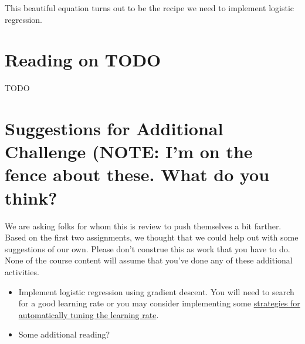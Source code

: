 \documentclass[assignment03_Solutions]{subfiles}
\begin{document}
This beautiful equation turns out to be the recipe we need to implement logistic regression.




\section{Reading on TODO}
TODO

\section{Suggestions for Additional Challenge (NOTE: I'm on the fence about these.  What do you think?}

We are asking folks for whom this is review to push themselves a bit farther.  Based on the first two assignments, we thought that we could help out with some suggestions of our own.  Please don't construe this as work that you have to do.  None of the course content will assume that you've done any of these additional activities.

\begin{itemize}
\item Implement logistic regression using gradient descent.  You will need to search for a good learning rate or you may consider implementing some \href{https://towardsdatascience.com/gradient-descent-algorithms-and-adaptive-learning-rate-adjustment-methods-79c701b086be}{strategies for automatically tuning the learning rate}.
\item Some additional reading?
\end{itemize}

\end{document}
